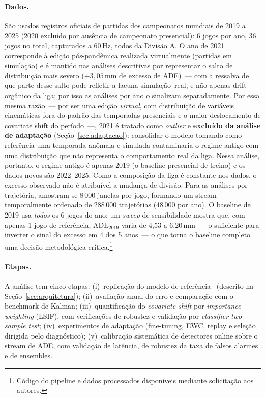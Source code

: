 \documentclass[runningheads]{llncs}
\begin{document}
\paragraph{Dados.}
S\~ao usados registros oficiais de partidas dos campeonatos mundiais de 2019 a 2025 (2020 exclu\'ido por aus\^encia de campeonato presencial): 6 jogos por ano, 36 jogos no total, capturados a 60\,Hz, todos da Divis\~ao A. O ano de 2021 corresponde \`a edi\c{c}\~ao p\'os-pand\^emica realizada virtualmente (partidas em simula\c{c}\~ao) e \'e mantido nas an\'alises descritivas por representar o salto de distribui\c{c}\~ao mais severo ($+3{,}05$\,mm de excesso de ADE)~--- com a ressalva de que parte desse salto pode refletir a lacuna simula\c{c}\~ao--real, e n\~ao apenas drift org\^anico da liga; por isso as an\'alises por ano o sinalizam separadamente. Por essa mesma raz\~ao~--- por ser uma edi\c{c}\~ao \emph{virtual}, com distribui\c{c}\~ao de vari\'aveis cinem\'aticas fora do padr\~ao das temporadas presenciais e o maior deslocamento de covariate shift do per\'iodo~---, 2021 \'e tratado como \emph{outlier} e \textbf{exclu\'ido da an\'alise de adapta\c{c}\~ao} (Se\c{c}\~ao~\ref{sec:adaptacao}): consolidar o modelo tomando como refer\^encia uma temporada anômala e simulada contaminaria o regime antigo com uma distribui\c{c}\~ao que n\~ao representa o comportamento real da liga. Nessa an\'alise, portanto, o regime antigo \'e apenas 2019 (o baseline presencial de treino) e os dados novos s\~ao 2022--2025. Como a composi\c{c}\~ao da liga \'e constante nos dados, o excesso observado n\~ao \'e atribu\'ivel a mudan\c{c}a de divis\~ao. Para as an\'alises por trajet\'oria, amostram-se 8\,000 janelas por jogo, formando um stream temporalmente ordenado de 288\,000 trajet\'orias (48\,000 por ano). O baseline de 2019 usa \emph{todos} os 6 jogos do ano: um \emph{sweep} de sensibilidade mostra que, com apenas 1 jogo de refer\^encia, $\mathrm{ADE}_{2019}$ varia de 4{,}53 a 6{,}20\,mm~--- o suficiente para inverter o sinal do excesso em 4 dos 5 anos~--- o que torna o baseline completo uma decis\~ao metodol\'ogica cr\'itica.\footnote{C\'odigo do pipeline e dados processados dispon\'iveis mediante solicita\c{c}\~ao aos autores.}

\paragraph{Etapas.}
A an\'alise tem cinco etapas: (i)~replica\c{c}\~ao do modelo de refer\^encia~\cite{seq2seq} (descrito na Se\c{c}\~ao~\ref{sec:arquitetura}); (ii)~avalia\c{c}\~ao anual do erro e compara\c{c}\~ao com o benchmark de Kalman; (iii)~quantifica\c{c}\~ao do \textit{covariate shift} por \textit{importance weighting} (LSIF), com verifica\c{c}\~oes de robustez e valida\c{c}\~ao por \textit{classifier two-sample test}; (iv)~experimentos de adapta\c{c}\~ao (fine-tuning, EWC, replay e sele\c{c}\~ao dirigida pelo diagn\'ostico); (v)~calibra\c{c}\~ao sistem\'atica de detectores online sobre o stream de ADE, com valida\c{c}\~ao de lat\^encia, de robustez da taxa de falsos alarmes e de ensembles.
\end{document}
